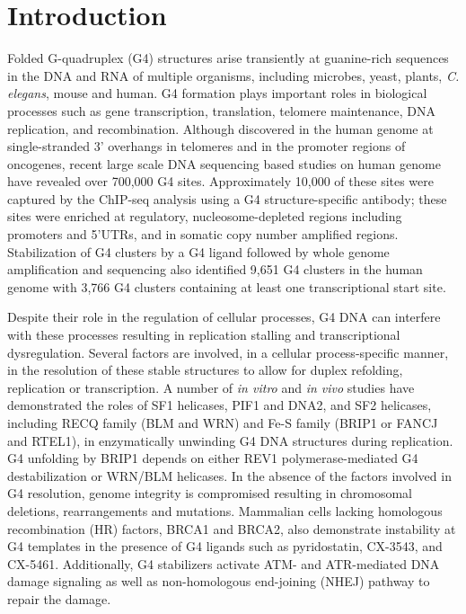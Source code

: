 \section*{Introduction}

Folded G-quadruplex (G4) structures arise transiently at guanine-rich sequences in the DNA and RNA of multiple organisms, including microbes, yeast, plants, \textit{C. elegans}, mouse and human\cite{GELLERT1962,Sen1988,Schaffitzel2001,Verma2008,Hershman2008,Smargiasso2009,Beaume2013,Perrone2017,Saranathan2018}. G4 formation plays important roles in biological processes such as gene transcription, translation, telomere maintenance, DNA replication, and recombination\cite{Siddiqui-Jain2002,Morris2010,Lopes2011}. Although discovered in the human genome at single-stranded 3' overhangs in telomeres and in the promoter regions of oncogenes, recent large scale DNA sequencing based studies on human genome have revealed over 700,000 G4 sites\cite{Granotier2005,Siddiqui-Jain2002,Cogoi2006,Sun2011,Chambers2015}. Approximately 10,000 of these sites were captured by the ChIP-seq analysis using a G4 structure-specific antibody; these sites were enriched at regulatory, nucleosome-depleted regions including promoters and 5'UTRs, and in somatic copy number amplified regions\cite{Hansel-Hertsch2016a}. Stabilization of G4 clusters by a G4 ligand followed by whole genome amplification and sequencing also identified 9,651 G4 clusters in the human genome with 3,766 G4 clusters containing at least one transcriptional start site\cite{Yoshida2018}. 

Despite their role in the regulation of cellular processes, G4 DNA can interfere with these processes resulting in replication stalling and transcriptional dysregulation. Several factors are involved, in a cellular process-specific manner, in the resolution of these stable structures to allow for duplex refolding, replication or transcription. A number of \textit{in vitro} and \textit{in vivo} studies have demonstrated the roles of SF1 helicases, PIF1 and DNA2, and SF2 helicases, including RECQ family (BLM and WRN) and Fe-S family (BRIP1 or FANCJ and RTEL1), in enzymatically unwinding G4 DNA structures during replication\cite{Sarkies2012,Piazza2010a,Paeschke2011a,Paeschke2013,Jimeno2018,Mendoza2016a}. G4 unfolding by BRIP1 depends on either REV1 polymerase-mediated G4 destabilization or WRN/BLM helicases\cite{Sarkies2012,Eddy2014}. In the absence of the factors involved in G4 resolution, genome integrity is compromised resulting in chromosomal deletions, rearrangements and mutations. Mammalian cells lacking homologous recombination (HR) factors, BRCA1 and BRCA2, also demonstrate instability at G4 templates in the presence of G4 ligands such as pyridostatin, CX-3543, and CX-5461\cite{Zimmer2015,Xu2017}. Additionally, G4 stabilizers activate ATM- and ATR-mediated DNA damage signaling as well as non-homologous end-joining (NHEJ) pathway to repair the damage\cite{Negi2015,Xu2017}. 

